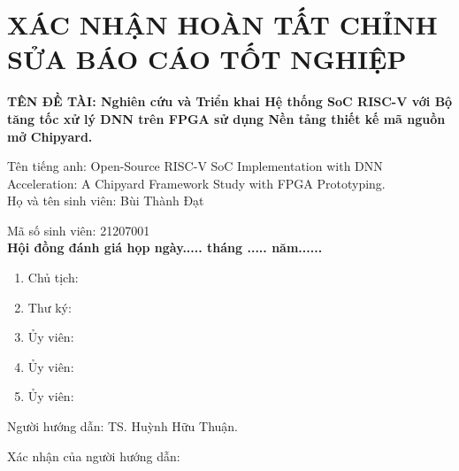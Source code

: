 \chapter*{XÁC NHẬN HOÀN TẤT CHỈNH SỬA BÁO CÁO TỐT NGHIỆP}

{\textbf{TÊN ĐỀ TÀI: Nghiên cứu và Triển khai Hệ thống SoC RISC-V với Bộ tăng tốc xử lý DNN trên FPGA sử dụng Nền tảng thiết kế mã nguồn mở Chipyard.}}

{\small Tên tiếng anh: Open-Source RISC-V SoC Implementation with DNN Acceleration: A Chipyard Framework Study with FPGA Prototyping.}\\[.1 cm]

Họ và tên sinh viên: Bùi Thành Đạt

Mã số sinh viên: 21207001 \\[.1 cm]

\textbf{Hội đồng đánh giá họp ngày..... tháng ..... năm......}

\begin{enumerate}
	\item Chủ tịch: 
	\item Thư ký: 
	\item Ủy viên: 
	\item Ủy viên: 
	\item Ủy viên: 
\end{enumerate}

\vspace{.2 cm}
Người hướng dẫn: TS. Huỳnh Hữu Thuận.

Xác nhận của người hướng dẫn: